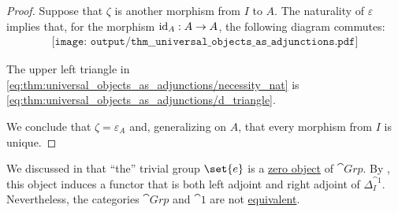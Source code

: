 \begin{proof}
  Suppose that \( \zeta \) is another morphism from \( I \) to \( A \). The naturality of \( \varepsilon \) implies that, for the morphism \( \operatorname{id}_A: A \to A \), the following diagram commutes:
  \begin{equation}\label{eq:thm:universal_objects_as_adjunctions/necessity_nat}
    \begin{aligned}
      \texttt{[image: output/thm\_\_universal\_objects\_as\_adjunctions.pdf]}
    \end{aligned}
  \end{equation}

  The upper left triangle in \eqref{eq:thm:universal_objects_as_adjunctions/necessity_nat} is \eqref{eq:thm:universal_objects_as_adjunctions/d_triangle}.

  We conclude that \( \zeta = \varepsilon_A \) and, generalizing on \( A \), that every morphism from \( I \) is unique.
\end{proof}

\begin{remark}\label{rem:left_and_right_adjoint_not_equivalence}
  We discussed in  that \enquote{the} trivial group \( \set{ e } \) is a \hyperref[def:universal_objects/zero]{zero object} of \( \cat{Grp} \). By , this object induces a functor that is both left adjoint and right adjoint of \( \Delta_I^{\cat{1}} \). Nevertheless, the categories \( \cat{Grp} \) and \( \cat{1} \) are not \hyperref[def:category_equivalence]{equivalent}.
\end{remark}

